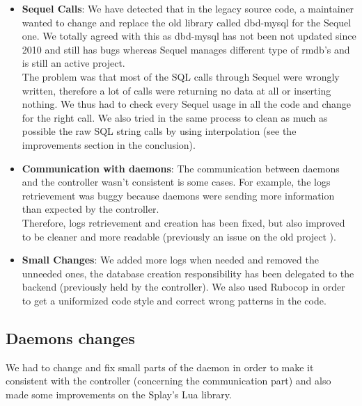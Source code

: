 \documentclass{eplmastersthesis}
\begin{document}
        \begin{itemize}
          \item \textbf{Sequel Calls}: We have detected that in the legacy
          source code, a maintainer wanted to change and replace the old library
          called dbd-mysql \cite{dbdMysql} for the Sequel \cite{Sequel} one. We
          totally agreed with this as dbd-mysql has not been not updated since
          2010 and still has bugs whereas Sequel manages different type of
          rmdb's and is still an active project.\\
          The problem was that most of the SQL calls through Sequel were wrongly
          written, therefore a lot of calls were returning no data at all or
          inserting nothing. We thus had to check every Sequel usage in all the
          code and change for the right call. We also tried in the same process
          to clean as much as possible the raw SQL string calls by using
          interpolation (see the improvements section in the conclusion).
          \item \textbf{Communication with daemons}: The communication between daemons
          and the controller wasn't consistent is some cases. For example, the
          logs retrievement was buggy because daemons were sending more
          information than expected by the controller.\\
          Therefore, logs retrievement and creation has been fixed, but
          also improved to be cleaner and more readable (previously an issue on
          the old project \cite{logTimestamps}).
          \item \textbf{Small Changes}: We added more logs when needed and
          removed the unneeded ones, the database creation responsibility has
          been delegated to the backend (previously held by the controller). We
          also used Rubocop \cite{Rubocop} in order to get a uniformized code
          style and correct wrong patterns in the code.
        \end{itemize}

      \subsection{Daemons changes}

        We had to change and fix small parts of the daemon in order to make
        it consistent with the controller (concerning the communication part)
        and also made some improvements on the Splay's Lua library.
\end{document}
